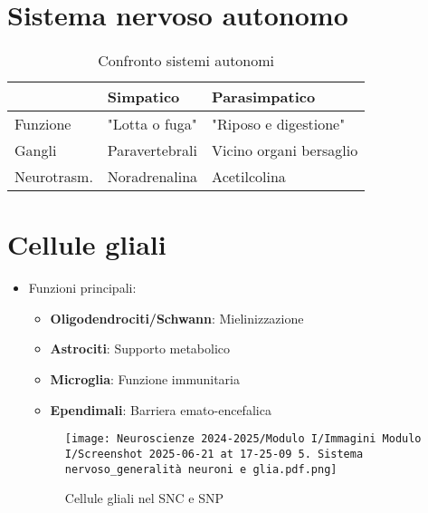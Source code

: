 \documentclass{article}
\begin{document}
\section{Sistema nervoso autonomo}
\begin{table}[h]
\centering
\begin{tabular}{lll}
\toprule
& Simpatico & Parasimpatico \\
\midrule
Funzione & "Lotta o fuga" & "Riposo e digestione" \\
Gangli & Paravertebrali & Vicino organi bersaglio \\
Neurotrasm. & Noradrenalina & Acetilcolina \\
\bottomrule
\end{tabular}
\caption{Confronto sistemi autonomi}
\end{table}

\section{Cellule gliali}
\begin{itemize}
\item Funzioni principali:
  \begin{itemize}
  \item \textbf{Oligodendrociti/Schwann}: Mielinizzazione
  \item \textbf{Astrociti}: Supporto metabolico
  \item \textbf{Microglia}: Funzione immunitaria
  \item \textbf{Ependimali}: Barriera emato-encefalica
  \end{itemize}

\begin{figure}[h]
\centering
\texttt{[image: Neuroscienze 2024-2025/Modulo I/Immagini Modulo I/Screenshot 2025-06-21 at 17-25-09 5. Sistema nervoso\_generalità neuroni e glia.pdf.png]}
\caption{Cellule gliali nel SNC e SNP}
\label{fig:glia}
\end{figure}
\end{itemize}

\end{document}
